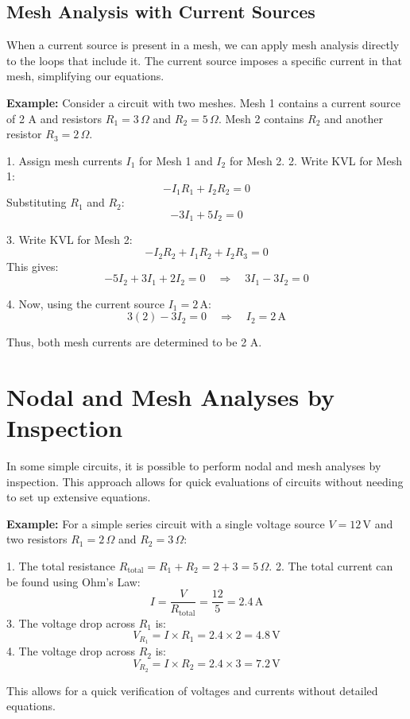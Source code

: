 \documentclass[openany]{book}
\begin{document}
\subsection{Mesh Analysis with Current Sources}
When a current source is present in a mesh, we can apply mesh analysis directly to the loops that include it. The current source imposes a specific current in that mesh, simplifying our equations.

\textbf{Example:} Consider a circuit with two meshes. Mesh 1 contains a current source of 2 A and resistors \(R_1 = 3 \, \Omega\) and \(R_2 = 5 \, \Omega\). Mesh 2 contains \(R_2\) and another resistor \(R_3 = 2 \, \Omega\).

1. Assign mesh currents \(I_1\) for Mesh 1 and \(I_2\) for Mesh 2.
2. Write KVL for Mesh 1:
   \[
   -I_1 R_1 + I_2 R_2 = 0
   \]
   Substituting \(R_1\) and \(R_2\):
   \[
   -3I_1 + 5I_2 = 0
   \]

3. Write KVL for Mesh 2:
   \[
   -I_2 R_2 + I_1 R_2 + I_2 R_3 = 0
   \]
   This gives:
   \[
   -5I_2 + 3I_1 + 2I_2 = 0 \quad \Rightarrow \quad 3I_1 - 3I_2 = 0
   \]

4. Now, using the current source \(I_1 = 2 \, \text{A}\):
   \[
   3(2) - 3I_2 = 0 \quad \Rightarrow \quad I_2 = 2 \, \text{A}
   \]

Thus, both mesh currents are determined to be 2 A.

\section{Nodal and Mesh Analyses by Inspection}
In some simple circuits, it is possible to perform nodal and mesh analyses by inspection. This approach allows for quick evaluations of circuits without needing to set up extensive equations.

\textbf{Example:} For a simple series circuit with a single voltage source \(V = 12 \, \text{V}\) and two resistors \(R_1 = 2 \, \Omega\) and \(R_2 = 3 \, \Omega\):

1. The total resistance \(R_{\text{total}} = R_1 + R_2 = 2 + 3 = 5 \, \Omega\).
2. The total current can be found using Ohm’s Law:
   \[
   I = \frac{V}{R_{\text{total}}} = \frac{12}{5} = 2.4 \, \text{A}
   \]
3. The voltage drop across \(R_1\) is:
   \[
   V_{R_1} = I \times R_1 = 2.4 \times 2 = 4.8 \, \text{V}
   \]
4. The voltage drop across \(R_2\) is:
   \[
   V_{R_2} = I \times R_2 = 2.4 \times 3 = 7.2 \, \text{V}
   \]

This allows for a quick verification of voltages and currents without detailed equations.
\end{document}

